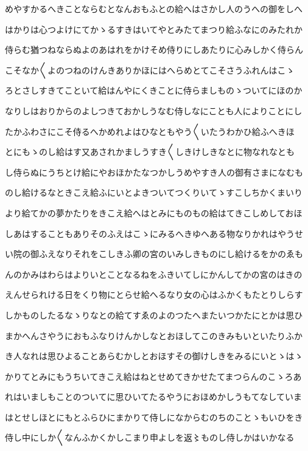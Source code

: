 \documentclass[a4paper,11pt,landscape]{ltjtarticle}
\begin{document}
めやすかるへきことならむとなんおもふとの給へはさかし人のうへの御をしへ
\par\medskip
はかりは心つよけにてかゝるすきはいてやとみたてまつり給ふなにのみたれか
\par\medskip
侍らむ猶つねならぬよのあはれをかけそめ侍りにしあたりに心みしかく侍らん
\par\medskip
こそなか〱よのつねのけんきありかほにはへらめとてこそさうふれんはこゝ
\par\medskip
ろとさしすきてこといて給はんやにくきことに侍らましものゝついてにほのか
\par\medskip
なりしはおりからのよしつきておかしうなむ侍しなにことも人によりことにし
\par\medskip
たかふわさにこそ侍るへかめれよはひなともやう〱いたうわかひ給ふへきほ
\par\medskip
とにもゝのし給はす又あされかましうすき〱しきけしきなとに物なれなとも
\par\medskip
し侍らぬにうちとけ給にやおほかたなつかしうめやすき人の御有さまになむも
\par\medskip
のし給けるなときこえ給ふにいとよきついてつくりいてゝすこしちかくまいり
\par\medskip
より給てかの夢かたりをきこえ給へはとみにものもの給はてきこしめしておほ
\par\medskip
しあはすることもありそのふえはこゝにみるへきゆへある物なりかれはやうせ
\par\medskip
い院の御ふえなりそれをこしきふ卿の宮のいみしきものにし給けるをかのゑも
\par\medskip
んのかみはわらはよりいとことなるねをふきいてしにかんしてかの宮のはきの
\par\medskip
えんせられける日をくり物にとらせ給へるなり女の心はふかくもたとりしらす
\par\medskip
しかものしたるなゝりなとの給てすゑのよのつたへまたいつかたにとかは思ひ
\par\medskip
まかへんさやうにおもふなりけんかしなとおほしてこのきみもいといたりふか
\par\medskip
き人なれは思ひよることあらむかしとおほすその御けしきをみるにいとゝはゝ
\par\medskip
かりてとみにもうちいてきこえ給はねとせめてきかせたてまつらんのこゝろあ
\par\medskip
れはいましもことのついてに思ひいてたるやうにおほめかしうもてなしていま
\par\medskip
はとせしほとにもとふらひにまかりて侍しになからむのちのことゝもいひをき
\par\medskip
侍し中にしか〱なんふかくかしこまり申よしを返〻ものし侍しかはいかなる
\end{document}
